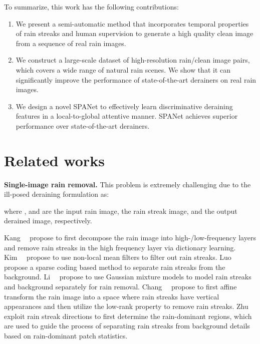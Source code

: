\documentclass[10pt,twocolumn,letterpaper]{article}
\begin{document}
To summarize, this work has the following contributions:
\begin{enumerate}
	\item We present a semi-automatic method that incorporates temporal properties of rain streaks and human supervision to generate a high quality clean image from a sequence of real rain images.

	\item We construct a large-scale dataset of  high-resolution rain/clean image pairs, which covers a wide range of natural rain scenes. We show that it can significantly improve the performance of state-of-the-art derainers on real rain images.

  \item We design a novel SPANet to effectively learn discriminative deraining features in a local-to-global attentive manner. SPANet achieves superior performance over state-of-the-art derainers.

\end{enumerate}



\section{Related works}

{\bf Single-image rain removal.} This problem is extremely challenging due to the ill-posed deraining formulation as:

where ,  and  are the input rain image, the rain streak image, and the output derained image, respectively.

Kang~\etal~\cite{kang:tip:2012:imgdecomp} propose to first decompose the rain image into high-/low-frequency layers and remove rain streaks in the high frequency layer via dictionary learning.
Kim~\etal~\cite{kim:tip:2015:videoderain} propose to use non-local mean filters to filter out rain streaks.
Luo~\etal~\cite{luo:iccv:2015:dsc} propose a sparse coding based method to separate rain streaks from the background.
Li~\etal~\cite{li:cvpr:2016:lp} propose to use Gaussian mixture models to model rain streaks and background separately for rain removal.
Chang~\etal~\cite{chang:iccv:2017:lpnr} propose to first affine transform the rain image into a space where rain streaks have vertical appearances and then utilize the low-rank property to remove rain streaks.
Zhu~\etal~\cite{zhu:iccv:2017:jbo} exploit rain streak directions to first determine the rain-dominant regions, which are used to guide the process of separating rain streaks from background details based on rain-dominant patch statistics.
\end{document}
